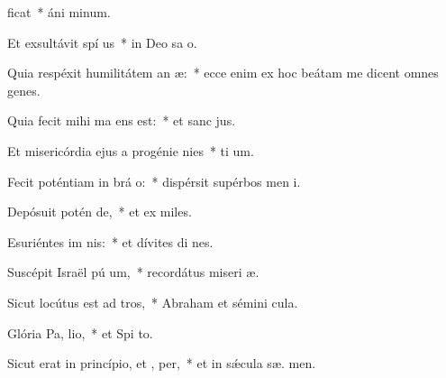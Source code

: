 \item {}ficat~* áni  minum.
\item Et exsultávit spí us~* in Deo sa o.
\item Quia respéxit humilitátem an æ:~* ecce enim ex hoc beátam me dicent omnes genes.
\item Quia fecit mihi ma  ens est:~* et sanc  jus.
\item Et misericórdia ejus a progénie  nies~* ti um.
\item Fecit poténtiam in brá o:~* dispérsit supérbos men  i.
\item Depósuit potén  de,~* et ex miles.
\item Esuriéntes im nis:~* et dívites di nes.
\item Suscépit Israël pú um,~* recordátus miseri æ.
\item Sicut locútus est ad  tros,~* Abraham et sémini   cula.
\item Glória Pa,  lio,~* et Spi to.
\item Sicut erat in princípio, et ,  per,~* et in sǽcula sæ. men.
